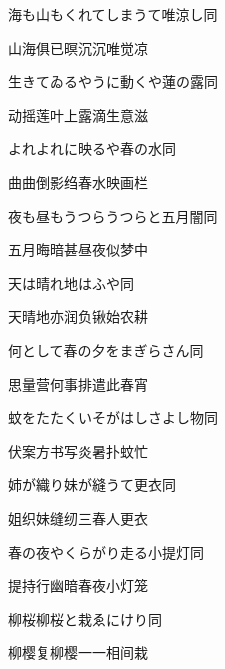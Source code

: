 \begin{haiku}
    {\FH 海も山もくれてしまうて唯涼し}\hfill{\FH 同}

    {\FK 山海俱已暝沉沉唯觉凉}
\end{haiku}

\begin{haiku}
    {\FH 生きてゐるやうに動くや蓮の露}\hfill{\FH 同}

    {\FK 动摇莲叶上露滴生意滋}
\end{haiku}

\begin{haiku}
    {\FH よれよれに映るや春の水}\hfill{\FH 同}

    {\FK 曲曲倒影绉春水映画栏}
\end{haiku}

\begin{haiku}
    {\FH 夜も昼もうつらうつらと五月闇}\hfill{\FH 同}

    {\FK 五月晦暗甚昼夜似梦中}
\end{haiku}

\begin{haiku}
    {\FH 天は晴れ地はふや}\hfill{\FH 同}

    {\FK 天晴地亦润负锹始农耕}
\end{haiku}

\begin{haiku}
    {\FH 何として春の夕をまぎらさん}\hfill{\FH 同}

    {\FK 思量营何事排遣此春宵}
\end{haiku}

\begin{haiku}
    {\FH 蚊をたたくいそがはしさよし物}\hfill{\FH 同}

    {\FK 伏案方书写炎暑扑蚊忙}
\end{haiku}

\begin{haiku}
    {\FH 姉が織り妹が縫うて更衣}\hfill{\FH 同}

    {\FK 姐织妹缝纫三春人更衣}
\end{haiku}

\begin{haiku}
    {\FH 春の夜やくらがり走る小提灯}\hfill{\FH 同}

    {\FK 提持行幽暗春夜小灯笼}
\end{haiku}

\begin{haiku}
    {\FH 柳桜柳桜と栽ゑにけり}\hfill{\FH 同}

    {\FK 柳樱复柳樱一一相间栽}
\end{haiku}

